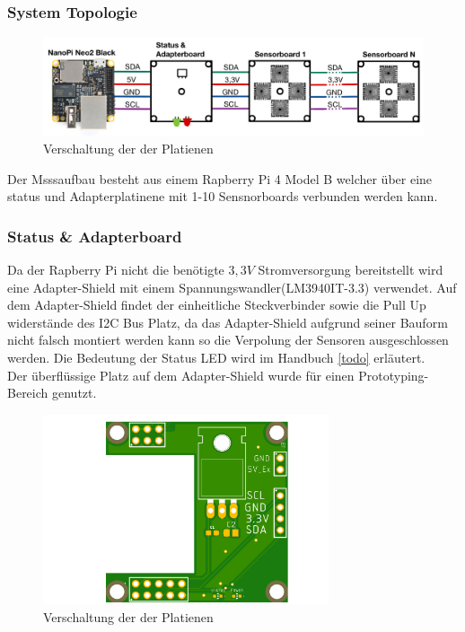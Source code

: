 \subsubsection{System Topologie}
\begin{figure}[H]
\centering
\includegraphics[width=1\textwidth]{img/System-Topologie.png}
\caption{Verschaltung der der Platienen}
\label{fig:Seitenasicht-AS726X}
\end{figure}

Der Msssaufbau besteht aus einem Rapberry Pi 4 Model B welcher über eine status und Adapterplatinene mit 1-10 Sensnorboards verbunden werden kann.


\subsubsection{Status \& Adapterboard}
Da der Rapberry Pi nicht die benötigte $3,3V$ Stromversorgung bereitstellt wird eine Adapter-Shield mit einem Spannungswandler(LM3940IT-3.3) verwendet.
Auf dem Adapter-Shield findet der einheitliche Steckverbinder sowie die Pull Up widerstände des I2C Bus Platz, da das Adapter-Shield aufgrund seiner Bauform nicht falsch montiert werden kann so die Verpolung der Sensoren ausgeschlossen werden.
Die Bedeutung der Status LED wird im Handbuch \ref{todo} erläutert.\\
Der überflüssige Platz auf dem Adapter-Shield wurde für einen Prototyping-Bereich genutzt.

\begin{figure}[H]
\centering
\includegraphics[width=0.75\textwidth]{img/nanopi-black2-shield}
\caption{Verschaltung der der Platienen}
\label{fig:Seitenasicht-AS726X}
\end{figure}
